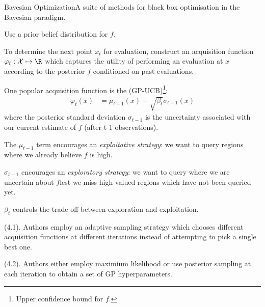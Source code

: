 \documentclass[11pt]{article}
\begin{document}
\begin{itemdefinition}{Bayesian Optimization}{A suite of methods for black box optimisation in the Bayesian paradigm.}
	\item Use a prior belief distribution for $f$.
	
	\item To determine the next point $x_t$ for evaluation, construct an acquisition function $\varphi_t : \mathcal X \mapsto \R$ which captures the utility of performing an evaluation at $x$ according to the posterior $f$ conditioned on past evaluations.
\end{itemdefinition}

One popular acquisition function is the  (GP-UCB)\footnote{Upper confidence bound for $f$.}:
\begin{align}
	\varphi_t (x)
	&= \mu_{t-1}(x) + \sqrt{\beta_t} \sigma_{t-1}(x)
\end{align}
where the posterior standard deviation $\sigma_{t-1}$ is the uncertainty associated with our current estimate of $f$ (after t-1 observations). 
\begin{compactitem}
	\item The $\mu_{t-1}$ term encourages an \textit{exploitative strategy}: we want to query regions where we already believe $f$ is high. 
	
	\item $\sigma_{t-1}$ encourages an \textit{exploratory strategy}: we want to query where we are uncertain about $f$lest we miss high valued regions which have not been queried yet. 
	
	\item $\beta_t$ controls the trade-off between exploration and exploitation.
\end{compactitem}

 (4.1). Authors employ an adaptive sampling strategy which chooses different acquisition functions at different iterations instead of attempting to pick a single best one. 

 (4.2). Authors either employ maximium likelihood or use posterior sampling at each iteration to obtain a set of GP hyperparameters. 
\end{document}
